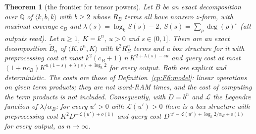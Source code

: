 \documentclass[11pt]{article}
\newtheorem{theorem}{Theorem}[section]
\theoremstyle{definition}
\theoremstyle{remark}
\providecommand{\Q}{\mathbb{Q}}
\newcommand{\mat}[3]{\langle #1,#2,#3\rangle} %
\newcommand{\cB}{c_B}                         %
\newcommand{\alB}{\alpha_B}                   %
\newcommand{\RB}{R_B}                         %
\newcommand{\Leg}{\mathcal{L}}                        %
\begin{document}
\begin{theorem}[the frontier for tensor powers]\label{cp:F6}
Let $B$ be an exact decomposition over $\Q$ of $\mat kbk$ with $b\ge2$ whose $\RB$ terms all have nonzero $z$-form, with maximal coverage $\cB$ and $\lambda(s)=\log_kS(s)-2$, $S(s)=\sum_\rho\deg(\rho)^s$ (all outputs read). Let $n\ge1$, $K=k^n$, $u>0$ and $s\in(0,1]$. There are an exact decomposition $\tilde B_n$ of $\mat K{b^n}K$ with $k^2\RB^n$ terms and a box structure for it with preprocessing cost at most $k^2(\cB+1)\,n\,K^{2+\lambda(s)-su}$ and query cost at most $(1+n\cB)K^{u(1-s)+\lambda(s)+\log_k2}$ for every output. Both are explicit and deterministic. The costs are those of Definition~\ref{cp:F6:model}: linear operations on given term products; they are not word-RAM times, and the cost of computing the term products is not included.
Consequently, with $D=b^n$ and $\Leg$ the Legendre function of $\lambda/\alB$: for every $u'>0$ with $\Leg(u')>0$ there is a box structure with preprocessing cost $K^2D^{-\Leg(u')+o(1)}$ and query cost $D^{\,u'-\Leg(u')+\log_k2/\alB+o(1)}$ for every output, as $n\to\infty$.
\end{theorem}
\end{document}
